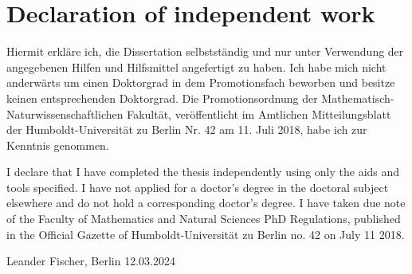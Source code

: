 \chapter*{Declaration of independent work}

Hiermit erkläre ich, die Dissertation selbstständig und nur unter Verwendung der angegebenen Hilfen und Hilfsmittel angefertigt zu haben. Ich habe mich nicht anderwärts um einen Doktorgrad in dem Promotionsfach beworben und besitze keinen entsprechenden Doktorgrad. Die Promotionsordnung der Mathematisch-Naturwissenschaftlichen Fakultät, veröffentlicht im Amtlichen Mitteilungsblatt der Humboldt-Universität zu Berlin Nr. 42 am 11. Juli 2018, habe ich zur Kenntnis genommen.

I declare that I have completed the thesis independently using only the aids and tools specified. I have not applied for a doctor's degree in the doctoral subject elsewhere and do not hold a corresponding doctor's degree. I have taken due note of the Faculty of Mathematics and Natural Sciences PhD Regulations, published in the Official Gazette of Humboldt-Universität zu Berlin no. 42 on July 11 2018.

\vspace{1cm}

Leander Fischer, Berlin 12.03.2024